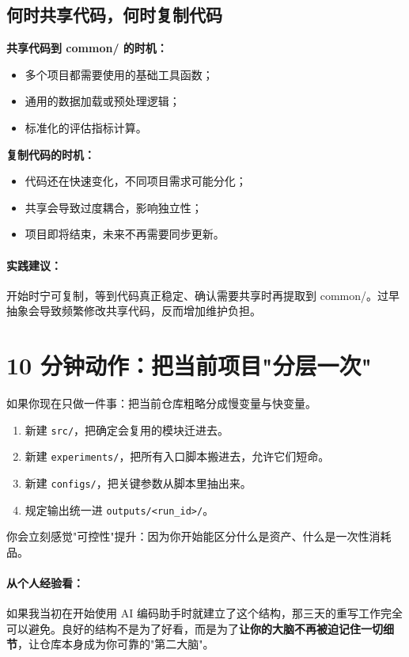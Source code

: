 \subsection{何时共享代码，何时复制代码}

\textbf{共享代码到 common/ 的时机：}
\begin{itemize}
  \item 多个项目都需要使用的基础工具函数；
  \item 通用的数据加载或预处理逻辑；
  \item 标准化的评估指标计算。
\end{itemize}

\textbf{复制代码的时机：}
\begin{itemize}
  \item 代码还在快速变化，不同项目需求可能分化；
  \item 共享会导致过度耦合，影响独立性；
  \item 项目即将结束，未来不再需要同步更新。
\end{itemize}

\paragraph{实践建议：}开始时宁可复制，等到代码真正稳定、确认需要共享时再提取到 common/。过早抽象会导致频繁修改共享代码，反而增加维护负担。

\section{10 分钟动作：把当前项目"分层一次"}

如果你现在只做一件事：把当前仓库粗略分成慢变量与快变量。

\begin{enumerate}
  \item 新建 \texttt{src/}，把确定会复用的模块迁进去。
  \item 新建 \texttt{experiments/}，把所有入口脚本搬进去，允许它们短命。
  \item 新建 \texttt{configs/}，把关键参数从脚本里抽出来。
  \item 规定输出统一进 \texttt{outputs/<run\_id>/}。
\end{enumerate}

你会立刻感觉"可控性"提升：因为你开始能区分什么是资产、什么是一次性消耗品。

\paragraph{从个人经验看：}如果我当初在开始使用 AI 编码助手时就建立了这个结构，那三天的重写工作完全可以避免。良好的结构不是为了好看，而是为了\textbf{让你的大脑不再被迫记住一切细节}，让仓库本身成为你可靠的"第二大脑"。
